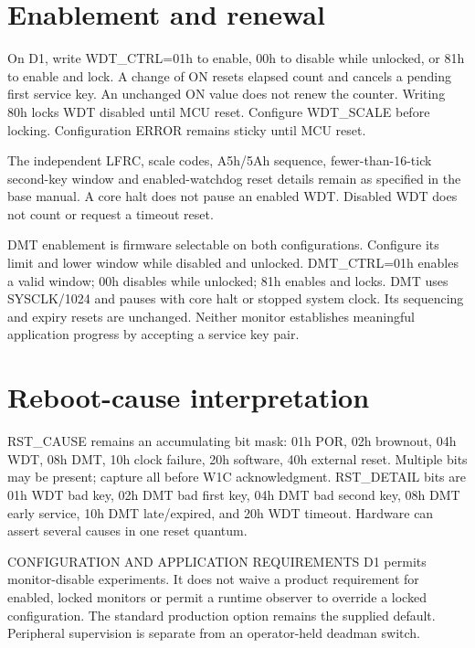 \documentclass[10pt]{article}
\begin{document}
\section*{Enablement and renewal}
On D1, write WDT\_CTRL=01h to enable, 00h to disable while unlocked, or 81h to enable and lock. A change of ON resets elapsed count and cancels a pending first service key. An unchanged ON value does not renew the counter. Writing 80h locks WDT disabled until MCU reset. Configure WDT\_SCALE before locking. Configuration ERROR remains sticky until MCU reset.

The independent LFRC, scale codes, A5h/5Ah sequence, fewer-than-16-tick second-key window and enabled-watchdog reset details remain as specified in the base manual. A core halt does not pause an enabled WDT. Disabled WDT does not count or request a timeout reset.

DMT enablement is firmware selectable on both configurations. Configure its limit and lower window while disabled and unlocked. DMT\_CTRL=01h enables a valid window; 00h disables while unlocked; 81h enables and locks. DMT uses SYSCLK/1024 and pauses with core halt or stopped system clock. Its sequencing and expiry resets are unchanged. Neither monitor establishes meaningful application progress by accepting a service key pair.
\section*{Reboot-cause interpretation}
RST\_CAUSE remains an accumulating bit mask: 01h POR, 02h brownout, 04h WDT, 08h DMT, 10h clock failure, 20h software, 40h external reset. Multiple bits may be present; capture all before W1C acknowledgment. RST\_DETAIL bits are 01h WDT bad key, 02h DMT bad first key, 04h DMT bad second key, 08h DMT early service, 10h DMT late/expired, and 20h WDT timeout. Hardware can assert several causes in one reset quantum.
\begin{Notice}{CONFIGURATION AND APPLICATION REQUIREMENTS}
D1 permits monitor-disable experiments. It does not waive a product requirement for enabled, locked monitors or permit a runtime observer to override a locked configuration. The standard production option remains the supplied default. Peripheral supervision is separate from an operator-held deadman switch.
\end{Notice}
\vfill{}
\end{document}
